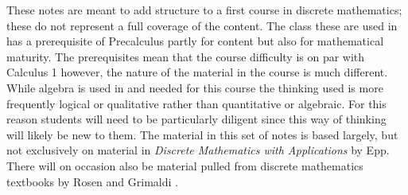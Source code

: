 
    These notes are meant to add structure to a first course in discrete mathematics; these do not represent a full coverage of the content.  The class these are used in has a prerequisite of Precalculus partly for content but also for mathematical maturity.  The prerequisites mean that the course difficulty is on par with Calculus 1 however, the nature of the material in the course is much different.  While algebra is used in and needed for this course the thinking used is more frequently logical or qualitative rather than quantitative or algebraic. For this reason students will need to be particularly diligent since this way of thinking will likely be new to them. The material in this set of notes is based largely, but not exclusively on material in \textit{Discrete Mathematics with Applications} by Epp\cite{epp2019discrete}.  There will on occasion also be material pulled from discrete mathematics textbooks by Rosen \cite{rosen2006discrete} and Grimaldi \cite{grimaldi1994discrete}.
